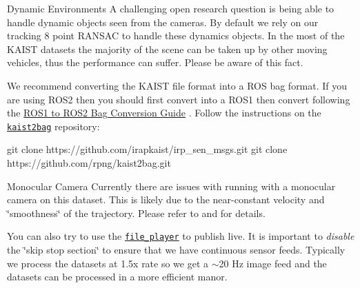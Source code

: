 \begin{DoxyParagraph}{Dynamic Environments}
A challenging open research question is being able to handle dynamic objects seen from the cameras. By default we rely on our tracking 8 point R\+A\+N\+S\+AC to handle these dynamics objects. In the most of the K\+A\+I\+ST datasets the majority of the scene can be taken up by other moving vehicles, thus the performance can suffer. Please be aware of this fact.
\end{DoxyParagraph}
We recommend converting the K\+A\+I\+ST file format into a R\+OS bag format. If you are using R\+O\+S2 then you should first convert into a R\+O\+S1 then convert following the \hyperlink{dev-ros1-to-ros2}{R\+O\+S1 to R\+O\+S2 Bag Conversion Guide} . Follow the instructions on the \href{https://github.com/rpng/kaist2bag}{\tt kaist2bag} repository\+:


\begin{DoxyCode}
git clone https://github.com/irapkaist/irp\_sen\_msgs.git
git clone https://github.com/rpng/kaist2bag.git
\end{DoxyCode}




\begin{DoxyParagraph}{Monocular Camera}
Currently there are issues with running with a monocular camera on this dataset. This is likely due to the near-\/constant velocity and \char`\"{}smoothness\char`\"{} of the trajectory. Please refer to \cite{Lee2020IROS} and \cite{Wu2017ICRA} for details.
\end{DoxyParagraph}
You can also try to use the \href{https://github.com/irapkaist/file_player}{\tt file\+\_\+player} to publish live. It is important to {\itshape disable} the \char`\"{}skip stop section\char`\"{} to ensure that we have continuous sensor feeds. Typically we process the datasets at 1.\+5x rate so we get a $\sim$20 Hz image feed and the datasets can be processed in a more efficient manor.

